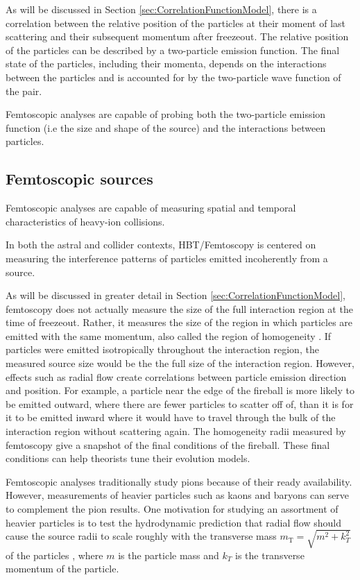 As will be discussed in Section \ref{sec:CorrelationFunctionModel}, there is a correlation between the relative position of the particles at their moment of last scattering and their subsequent momentum after freezeout.
The relative position of the particles can be described by a two-particle emission function. The final state of the particles, including their momenta, depends on the interactions between the particles and is accounted for by the two-particle wave function of the pair.

Femtoscopic analyses are capable of probing both the two-particle emission function (i.e the size and shape of the source) and the interactions between particles. 
\subsection{Femtoscopic sources}
\label{sec:FemtoSources}
Femtoscopic analyses are capable of measuring spatial and temporal characteristics of heavy-ion collisions.

In both the astral and collider contexts, HBT/Femtoscopy is centered on measuring the interference patterns of particles emitted incoherently from a source.

As will be discussed in greater detail in Section \ref{sec:CorrelationFunctionModel}, femtoscopy does not actually measure the size of the full interaction region at the time of freezeout.
Rather, it measures the size of the region in which particles are emitted with the same momentum, also called the region of homogeneity \cite{Akkelin:1995gh}.
If particles were emitted isotropically throughout the interaction region, the measured source size would be the the full size of the interaction region.
However, effects such as radial flow create correlations between particle emission direction and position. 
For example, a particle near the edge of the fireball is more likely to be emitted outward, where there are fewer particles to scatter off of, than it is for it to be emitted inward where it would have to travel through the bulk of the interaction region without scattering again. 
The homogeneity radii measured by femtoscopy give a snapshot of the final conditions of the fireball.
These final conditions can help theorists tune their evolution models.

Femtoscopic analyses traditionally study pions \cite{Goldhaber:1960sf,Aamodt:2011mr} because of their ready availability.  
However, measurements of heavier particles such as kaons \cite{Abelev:2012ms} and baryons \cite{Gos:2007cj} can serve to complement the pion results.  
One motivation for studying an assortment of heavier particles is to test the hydrodynamic prediction that radial flow should cause the source radii to scale roughly with the transverse mass $m_{\mathrm{T}} = \sqrt{m^2 + k^2_T}$ of the particles \cite{Csorgo:1995bi,Lisa:2005dd}, where $m$ is the particle mass and $k_T$ is the transverse momentum of the particle.

